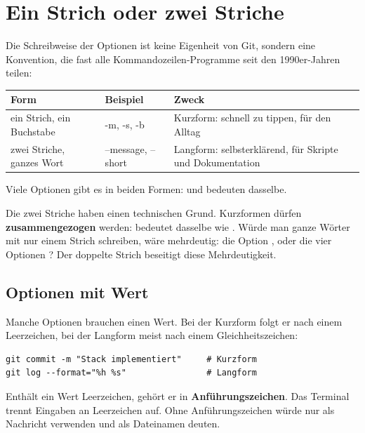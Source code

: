 \section{Ein Strich oder zwei Striche}

Die Schreibweise der Optionen ist keine Eigenheit von Git, sondern eine Konvention, die
fast alle Kommandozeilen-Programme seit den 1990er-Jahren teilen:

\begin{center}
\renewcommand{\arraystretch}{1.3}
\begin{tabularx}{\linewidth}{@{}l>{\ttfamily}l>{\raggedright\arraybackslash}X@{}}
  \toprule
  \textbf{Form} & \normalfont\textbf{Beispiel} & \textbf{Zweck} \\
  \midrule
  ein Strich, ein Buchstabe & -m, -s, -b & Kurzform: schnell zu tippen, für den Alltag \\
  zwei Striche, ganzes Wort & --message, --short & Langform: selbsterklärend, für Skripte und Dokumentation \\
  \bottomrule
\end{tabularx}
\end{center}

Viele Optionen gibt es in beiden Formen:  und  bedeuten dasselbe.

Die zwei Striche haben einen technischen Grund. Kurzformen dürfen \textbf{zusammengezogen}
werden:  bedeutet dasselbe wie . Würde man ganze Wörter mit nur einem
Strich schreiben, wäre  mehrdeutig: die Option , oder die vier
Optionen ? Der doppelte Strich beseitigt diese Mehrdeutigkeit.

\subsection*{Optionen mit Wert}

Manche Optionen brauchen einen Wert. Bei der Kurzform folgt er nach einem Leerzeichen, bei
der Langform meist nach einem Gleichheitszeichen:

\begin{lstlisting}[style=befehle]
git commit -m "Stack implementiert"     # Kurzform
git log --format="%h %s"                # Langform
\end{lstlisting}

Enthält ein Wert Leerzeichen, gehört er in \textbf{Anführungszeichen}. Das Terminal trennt
Eingaben an Leerzeichen auf. Ohne Anführungszeichen würde
 nur  als Nachricht verwenden und
 als Dateinamen deuten.

